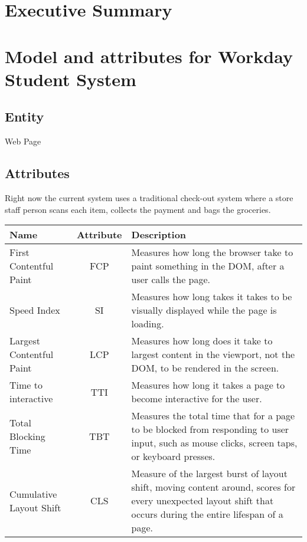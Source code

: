 \section{Executive Summary}

\pagebreak

\section{Model and attributes for Workday Student System}

\subsection{Entity}
Web Page

\subsection{Attributes}
Right now the current system uses a traditional check-out system where a store 
staff person scans each item, collects the payment 
and bags the groceries. \newline
\begin{center}
    \begin{tabular}{|l c p{7cm}|} 
        \hline
        Name & Attribute & Description \\ [0.5ex] 
        \hline
        First Contentful Paint & FCP & Measures how long the browser take to paint something in the DOM, after a user calls the page.\\ 
        \hline
        Speed Index & SI & Measures how long takes it takes to be visually displayed while the page is loading.\\
        \hline
        Largest Contentful Paint & LCP & Measures how long does it take to largest content in the viewport, not the DOM, to be rendered in the screen.\\
        \hline
        Time to interactive & TTI & Measures how long it takes a page to become interactive for the user. \\
        \hline
        Total Blocking Time & TBT & Measures the total time that  for a page to be blocked from responding to user input, such as mouse clicks, screen taps, or keyboard presses. \\ 
        \hline
        Cumulative Layout Shift & CLS &
        Measure of the largest burst of layout shift, moving content around, scores for every unexpected layout shift that occurs during the entire lifespan of a page. \\ 
        \hline
    \end{tabular}
\end{center}
\pagebreak
